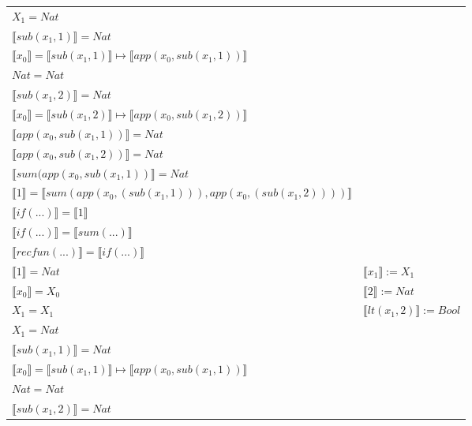 \begin{exercise}
\begin{description}
\begin{center}
\begin{longtable}{ | l | l | }
                        $X_1 = Nat$ & \\
                        $ \llbracket sub(x_1,1) \rrbracket = Nat$ & \\
                        $ \llbracket x_0 \rrbracket =  \llbracket sub(x_1,1) \rrbracket \mapsto  \llbracket app(x_0, sub(x_1,1)) \rrbracket$ & \\
                        $Nat = Nat$ & \\
                        $ \llbracket sub(x_1,2) \rrbracket = Nat$ & \\
                        $ \llbracket x_0 \rrbracket = \llbracket sub(x_1,2) \rrbracket \mapsto  \llbracket app(x_0, sub(x_1,2)) \rrbracket$ & \\
                        $ \llbracket app(x_0, sub(x_1,1)) \rrbracket = Nat$ & \\
                        $ \llbracket app(x_0, sub(x_1,2)) \rrbracket = Nat$ & \\
                        $ \llbracket sum(app(x_0, sub(x_1,1)) \rrbracket = Nat$ & \\
                        $ \llbracket 1 \rrbracket =  \llbracket sum(app(x_0, (sub(x_1,1))), app(x_0, (sub(x_1,2)))) \rrbracket$ & \\
                        $ \llbracket if(...) \rrbracket =  \llbracket 1 \rrbracket$ & \\
                        $ \llbracket if(...) \rrbracket =  \llbracket sum(...) \rrbracket$ & \\
                        $ \llbracket recfun(...) \rrbracket =  \llbracket if(...) \rrbracket$ & \\
                    \hline
                        $ \llbracket 1 \rrbracket = Nat$ & $ \llbracket x_1 \rrbracket := X_1$ \\
                        $ \llbracket x_0 \rrbracket = X_0$ & $ \llbracket 2 \rrbracket := Nat$\\
                        $X_1 = X_1$ & $ \llbracket lt(x_1 , 2) \rrbracket := Bool$\\
                        $X_1 = Nat$ & \\
                        $ \llbracket sub(x_1,1) \rrbracket = Nat$ & \\
                        $ \llbracket x_0 \rrbracket =  \llbracket sub(x_1,1) \rrbracket \mapsto  \llbracket app(x_0, sub(x_1,1)) \rrbracket$ & \\
                        $Nat = Nat$ & \\
                        $ \llbracket sub(x_1,2) \rrbracket = Nat$ & \\

\end{longtable}
\end{center}
\end{description}
\end{exercise}
